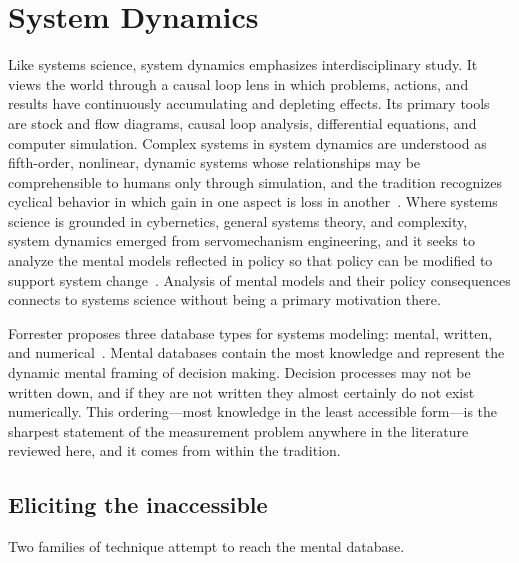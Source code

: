 \documentclass[11pt,a4paper]{article}
\begin{document}
\section{System Dynamics}
\label{sec:sd}

Like systems science, system dynamics emphasizes interdisciplinary study. It
views the world through a causal loop lens in which problems, actions, and
results have continuously accumulating and depleting effects. Its primary tools
are stock and flow diagrams, causal loop analysis, differential equations, and
computer simulation. Complex systems in system dynamics are understood as
fifth-order, nonlinear, dynamic systems whose relationships may be
comprehensible to humans only through simulation, and the tradition recognizes
cyclical behavior in which gain in one aspect is loss in
another~\citep{forrester2009}. Where systems science is grounded in cybernetics,
general systems theory, and complexity, system dynamics emerged from
servomechanism engineering, and it seeks to analyze the mental models reflected
in policy so that policy can be modified to support system
change~\citep{lane2000}. Analysis of mental models and their policy consequences
connects to systems science without being a primary motivation there.

Forrester proposes three database types for systems modeling: mental, written,
and numerical~\citep{forrester2009}. Mental databases contain the most knowledge
and represent the dynamic mental framing of decision making. Decision processes
may not be written down, and if they are not written they almost certainly do
not exist numerically. This ordering---most knowledge in the least accessible
form---is the sharpest statement of the measurement problem anywhere in the
literature reviewed here, and it comes from within the tradition.

\subsection{Eliciting the inaccessible}

Two families of technique attempt to reach the mental database.
\end{document}
